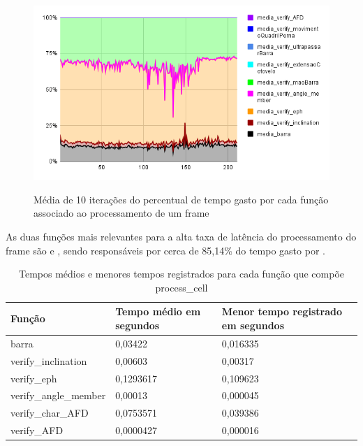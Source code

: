 \begin{figure}[H]
	\centering
	\caption{Média de 10 iterações do percentual de tempo gasto por cada função associado ao processamento de um frame}
	\includegraphics[scale=0.7]{figuras/grafico/comp_process_cell_1.png}
	\label{graf:G14}
\end{figure}

As duas funções mais relevantes para a alta taxa de latência do processamento do frame são  e , sendo responsáveis por cerca de 85,14\% do tempo gasto por .

\begin{table}[H]
	\centering
	\begin{tabular}{|p{6cm}|p{3cm}|p{5cm}|}
	\hline
	\textbf{Função} & \textbf{Tempo médio em segundos} & \textbf{Menor tempo registrado em segundos} \\
	\hline
	barra & 0,03422 & 0,016335 \\
	verify\_inclination & 0,00603 & 0,00317 \\
	verify\_eph & 0,1293617 & 0,109623 \\
	verify\_angle\_member & 0,00013 & 0,000045 \\
	verify\_char\_AFD & 0,0753571 & 0,039386 \\
	verify\_AFD & 0,0000427 & 0,000016 \\
	\hline
	\end{tabular}
	\caption{Tempos médios e menores tempos registrados para cada função que compõe process\_cell}
	\label{tab:tempos_funcoes}
\end{table}



